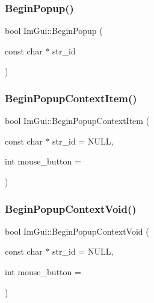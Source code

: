 \mbox{\label{namespace_im_gui_ab71527de4b52ff970e5396040302e134}} 
\subsubsection{\texorpdfstring{Begin\+Popup()}{BeginPopup()}}
{\footnotesize\ttfamily bool Im\+Gui\+::\+Begin\+Popup (\begin{DoxyParamCaption}\item[{const char $\ast$}]{str\+\_\+id }\end{DoxyParamCaption})}

\mbox{\label{namespace_im_gui_a579fc507f5b5d164c8fd628aee3d7bbd}} 
\subsubsection{\texorpdfstring{Begin\+Popup\+Context\+Item()}{BeginPopupContextItem()}}
{\footnotesize\ttfamily bool Im\+Gui\+::\+Begin\+Popup\+Context\+Item (\begin{DoxyParamCaption}\item[{const char $\ast$}]{str\+\_\+id = {\ttfamily NULL},  }\item[{int}]{mouse\+\_\+button = {} }\end{DoxyParamCaption})}

\mbox{\label{namespace_im_gui_a87a2228929503fff067d2e167a690751}} 
\subsubsection{\texorpdfstring{Begin\+Popup\+Context\+Void()}{BeginPopupContextVoid()}}
{\footnotesize\ttfamily bool Im\+Gui\+::\+Begin\+Popup\+Context\+Void (\begin{DoxyParamCaption}\item[{const char $\ast$}]{str\+\_\+id = {\ttfamily NULL},  }\item[{int}]{mouse\+\_\+button = {} }\end{DoxyParamCaption})}

